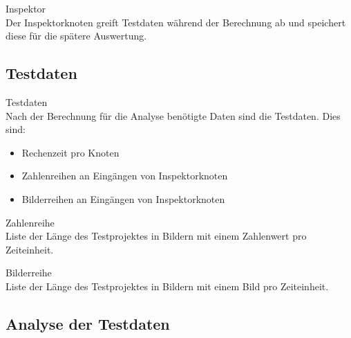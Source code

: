 \begin{speclist}[F]
\setcounter{specnum}{23010}

\spec Inspektor \\
Der Inspektorknoten greift Testdaten während der Berechnung ab und speichert diese für die spätere Auswertung.

\end{speclist}

\subsection{Testdaten}

\begin{speclist}[F]
\setcounter{specnum}{31010}

\spec Testdaten \\
Nach der Berechnung für die Analyse benötigte Daten sind die Testdaten. Dies sind:
\begin{itemize}
	\item Rechenzeit pro Knoten
	\item Zahlenreihen an Eingängen von Inspektorknoten
	\item Bilderreihen an Eingängen von Inspektorknoten
\end{itemize}

\spec Zahlenreihe \\
Liste der Länge des Testprojektes in Bildern mit einem Zahlenwert pro Zeiteinheit.

\spec Bilderreihe \\
Liste der Länge des Testprojektes in Bildern mit einem Bild pro Zeiteinheit.

\end{speclist}

\subsection{Analyse der Testdaten}

